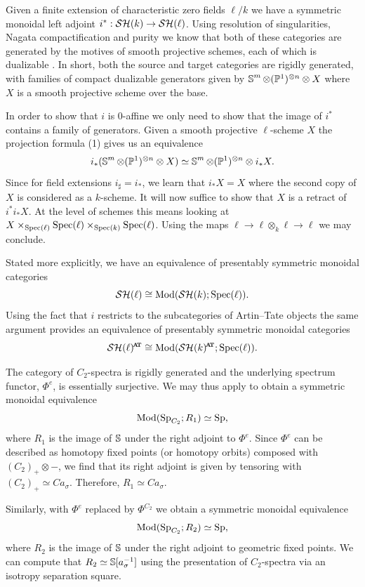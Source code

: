 \begin{exm}
  Given a finite extension of characteristic zero fields $\ell/k$ we have a symmetric monoidal left adjoint $ i^* : \mathcal{SH}(k) \to \mathcal{SH}(\ell) $.
Using resolution of singularities, Nagata compactification and purity we know that both of these categories are generated by the motives of smooth projective schemes, each of which is dualizable \cite{MotivicModules}. In short,
   both the source and target categories are rigidly generated, with families of compact dualizable generators given by $\operatorname{\mathbb{S}}^m \otimes (\mathbb{P}^1)^{\otimes n} \otimes X$ where $X$ is a smooth projective scheme over the base.
  
  In order to show that $i$ is 0-affine we only need to show that the image of $i^*$ contains a family of generators. Given a smooth projective $\ell$-scheme $X$ the projection formula (1) gives us an equivalence
  \[ i_*(\operatorname{\mathbb{S}}^m \otimes (\mathbb{P}^1)^{\otimes n} \otimes X) \simeq \operatorname{\mathbb{S}}^m \otimes (\mathbb{P}^1)^{\otimes n} \otimes i_*X. \]
  Since for field extensions $i_{\sharp} = i_*$, we learn that $i_*X = X$ where the second copy of $X$ is considered as a $k$-scheme. It will now suffice to show that $X$ is a retract of $i^*i_*X$. At the level of schemes this means looking at $ X \times_{\operatorname{\mathrm{Spec}}(\ell)} \operatorname{\mathrm{Spec}}(\ell) \times_{\operatorname{\mathrm{Spec}}(k)} \operatorname{\mathrm{Spec}}(\ell) $. Using the maps $\ell \to \ell \otimes_k \ell \to \ell$ we may conclude.

  Stated more explicitly,
  we have an equivalence of presentably symmetric monoidal categories
  \[ \mathcal{SH}(\ell) \cong \mathrm{Mod}( \mathcal{SH}(k) ; \operatorname{\mathrm{Spec}}(\ell) ). \]
  Using the fact that $i$ restricts to the subcategories of Artin--Tate objects the same argument provides an equivalence of presentably symmetric monoidal categories
  \[ \SH(\ell)^{\at} \cong \Mod ( \SHkat ; \Spec(\ell) ). \]
\end{exm}

\begin{exm} \label{exm:c2-underlying}
  The category of $C_2$-spectra is rigidly generated and the underlying spectrum functor, $\Phi^e$, is essentially surjective.  We may thus apply  to obtain a symmetric monoidal equivalence
  \[ \mathrm{Mod}( \operatorname{\mathrm{Sp}}_{C_2} ; R_1) \simeq \operatorname{\mathrm{Sp}}, \]
  where $R_1$ is the image of $\operatorname{\mathbb{S}}$ under the right adjoint to $\Phi^e$.
  Since $\Phi^e$ can be described as homotopy fixed points (or homotopy orbits) composed with $(C_{2})_+ \otimes -$, we find that its right adjoint is given by tensoring with $(C_{2})_+ \simeq Ca_\sigma$. Therefore, $R_1 \simeq Ca_\sigma$.

  Similarly, with $\Phi^e$ replaced by $\Phi^{C_2}$ we obtain a symmetric monoidal equivalence
  \[ \mathrm{Mod}( \operatorname{\mathrm{Sp}}_{C_2} ; R_2) \simeq \operatorname{\mathrm{Sp}}, \]
  where $R_2$ is the image of $\operatorname{\mathbb{S}}$ under the right adjoint to geometric fixed points.
  We can compute that $R_2 \simeq \operatorname{\mathbb{S}}[a_\sigma^{-1}]$ using the presentation of $C_2$-spectra via an isotropy separation square. 
\end{exm}


